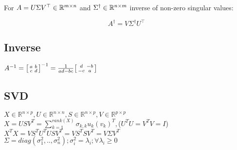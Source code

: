 For $A = U \Sigma V^\top \in \mathbb{R}^{m \times n}$ and $\Sigma^\dagger \in \mathbb{R}^{n \times m}$ inverse of non-zero singular values:

$$
A^\dagger = V \Sigma^\dagger U^\top
$$

\subsection*{Inverse}

$A^{-1}=
\begin{bsmallmatrix}
a&b \\ 
c&d
\end{bsmallmatrix}^{-1}=\frac{1}{ad-bc}
\begin{bsmallmatrix}
d&-b \\ 
-c&a
\end{bsmallmatrix}
$

\subsection*{SVD}
$X\in \mathbb{R}^{n\times p}, U\in \mathbb{R}^{n\times n}, S\in \mathbb{R}^{n\times p},
V\in \mathbb{R}^{p\times p}$\\
$X=USV^T=\sum_{k=1}^{rank(X)}\sigma_{k,k}u_k (v_k)^T,\!${\tiny{($U^TU=V^TV=I$)}}\\
$X^TX=VS^TU^TUSV^T=VS^TSV^T=V\Sigma V^T$\\
$\Sigma = diag(\sigma_1^2,..,\sigma_n^2);\sigma_i^2=\lambda_i; \forall \lambda_i \geq 0$
